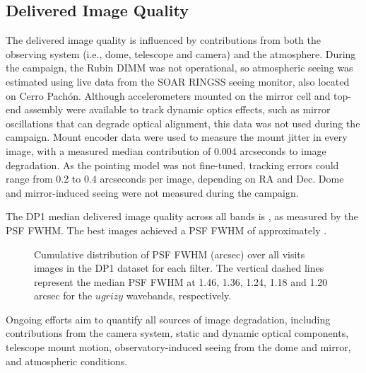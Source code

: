 \subsection{Delivered Image Quality}
\label{ssec:image_quality}
The delivered image quality is influenced by contributions from both the observing system (i.e., dome, telescope and camera) and the atmosphere.
During the campaign, the Rubin \gls{DIMM} was not operational, so atmospheric seeing was estimated using live data from the \gls{SOAR} \gls{RINGSS} seeing monitor, also located on Cerro Pach\'on.
Although accelerometers mounted on the mirror cell and top-end assembly were available to track dynamic optics effects, such as mirror oscillations that can degrade optical alignment, this data was not used during the campaign.
Mount encoder data were used to measure the mount jitter in every image, with a measured median contribution of 0.004 arcseconds to image degradation.
As the pointing model was not fine-tuned, tracking errors could range from 0.2 to 0.4 arcseconds per image, depending on RA and Dec.
Dome and mirror-induced \gls{seeing} were not measured during the campaign.

% 
The DP1 median delivered image quality across all bands is \medianimagequalityallbands, as measured by the \gls{PSF} \gls{FWHM}.
The best images achieved a \gls{PSF} \gls{FWHM} of approximately \bestimagequality.
\begin{figure}[htb]
\centering
{}
\caption{Cumulative distribution of PSF FWHM (arcsec) over all \nvisitdetectorsummaries visits images in the DP1 dataset for each filter.
The vertical dashed lines represent the median PSF FWHM at 1.46, 1.36, 1.24, 1.18 and 1.20 arcsec for the $ugrizy$ wavebands, respectively.}
\label{fig:delivered_image_quality_ecdf}
\end{figure}
Ongoing efforts aim to quantify all sources of image degradation,  including contributions from the camera system, static and dynamic optical components, telescope mount motion,  observatory-induced seeing from the dome and mirror, and atmospheric conditions.
